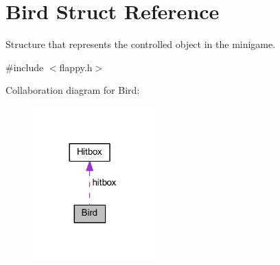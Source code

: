\hypertarget{struct_bird}{}\section{Bird Struct Reference}
\label{struct_bird}


Structure that represents the controlled object in the minigame.  




{\ttfamily \#include $<$flappy.\+h$>$}



Collaboration diagram for Bird\+:\nopagebreak
\begin{figure}[H]
\begin{center}
\leavevmode
\includegraphics[width=132pt]{struct_bird__coll__graph}
\end{center}
\end{figure}
